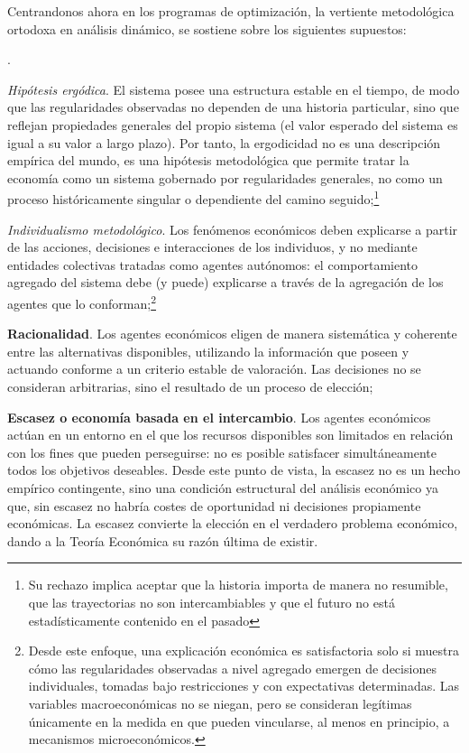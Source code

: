 \documentclass[10pt,a4paper]{article}
\newcounter{numitem}
\newenvironment{lnum}
      {\begin{list}{\arabic{numitem}.}{%
          \usecounter{numitem}%
          \setlength{\leftmargin}{1cm}%
          \setlength{\parskip}{3pt}%
          \setlength{\itemsep}{0pt}%
          \setlength{\parsep}{0pt}%
      }}
      {\end{list}}
\begin{document}
Centrandonos ahora en los programas de optimización, la vertiente metodológica ortodoxa en análisis dinámico, se sostiene sobre los siguientes supuestos:
\begin{lnum}
    \item \textit{Hipótesis ergódica}. El sistema posee una estructura estable en el tiempo, de modo que las regularidades observadas no dependen de una historia particular, sino que reflejan propiedades generales del propio sistema (el valor esperado del sistema es igual a su valor a largo plazo). Por tanto, la ergodicidad no es una descripción empírica del mundo, es una hipótesis metodológica que permite tratar la economía como un sistema gobernado por regularidades generales, no como un proceso históricamente singular o dependiente del camino seguido;\footnote{%
        Su rechazo implica aceptar que la historia importa de manera no resumible, que las trayectorias no son intercambiables y que el futuro no está estadísticamente contenido en el pasado
    }
    \item \textit{Individualismo metodológico}. Los fenómenos económicos deben explicarse a partir de las acciones, decisiones e interacciones de los individuos, y no mediante entidades colectivas tratadas como agentes autónomos: el comportamiento agregado del sistema debe (y puede) explicarse a través de la agregación de los agentes que lo conforman;\footnote{%
        Desde este enfoque, una explicación económica es satisfactoria solo si muestra cómo las regularidades observadas a nivel agregado emergen de decisiones individuales, tomadas bajo restricciones y con expectativas determinadas. Las variables macroeconómicas no se niegan, pero se consideran legítimas únicamente en la medida en que pueden vincularse, al menos en principio, a mecanismos microeconómicos.
    } 
    \item \textbf{Racionalidad}. Los agentes económicos eligen de manera sistemática y coherente entre las alternativas disponibles, utilizando la información que poseen y actuando conforme a un criterio estable de valoración. Las decisiones no se consideran arbitrarias, sino el resultado de un proceso de elección;
    \item \textbf{Escasez o economía basada en el intercambio}. Los agentes económicos actúan en un entorno en el que los recursos disponibles son limitados en relación con los fines que pueden perseguirse: no es posible satisfacer simultáneamente todos los objetivos deseables. Desde este punto de vista, la escasez no es un hecho empírico contingente, sino una condición estructural del análisis económico ya que, sin escasez no habría costes de oportunidad ni decisiones propiamente económicas. La escasez convierte la elección en el verdadero problema económico, dando a la Teoría Económica su razón última de existir.
\end{lnum}
\end{document}
